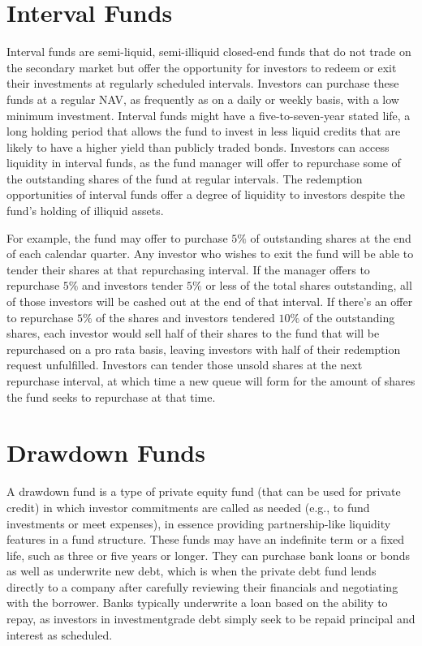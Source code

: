 \documentclass[11pt]{article}
\begin{document}
\section*{Interval Funds}
Interval funds are semi-liquid, semi-illiquid closed-end funds that do not trade on the secondary market but offer the opportunity for investors to redeem or exit their investments at regularly scheduled intervals. Investors can purchase these funds at a regular NAV, as frequently as on a daily or weekly basis, with a low minimum investment. Interval funds might have a five-to-seven-year stated life, a long holding period that allows the fund to invest in less liquid credits that are likely to have a higher yield than publicly traded bonds. Investors can access liquidity in interval funds, as the fund manager will offer to repurchase some of the outstanding shares of the fund at regular intervals. The redemption opportunities of interval funds offer a degree of liquidity to investors despite the fund's holding of illiquid assets.

For example, the fund may offer to purchase $5 \%$ of outstanding shares at the end of each calendar quarter. Any investor who wishes to exit the fund will be able to tender their shares at that repurchasing interval. If the manager offers to repurchase $5 \%$ and investors tender $5 \%$ or less of the total shares outstanding, all of those investors will be cashed out at the end of that interval. If there's an offer to repurchase $5 \%$ of the shares and investors tendered $10 \%$ of the outstanding shares, each investor would sell half of their shares to the fund that will be repurchased on a pro rata basis, leaving investors with half of their redemption request unfulfilled. Investors can tender those unsold shares at the next repurchase interval, at which time a new queue will form for the amount of shares the fund seeks to repurchase at that time.

\section*{Drawdown Funds}
A drawdown fund is a type of private equity fund (that can be used for private credit) in which investor commitments are called as needed (e.g., to fund investments or meet expenses), in essence providing partnership-like liquidity features in a fund structure. These funds may have an indefinite term or a fixed life, such as three or five years or longer. They can purchase bank loans or bonds as well as underwrite new debt, which is when the private debt fund lends directly to a company after carefully reviewing their financials and negotiating with the borrower. Banks typically underwrite a loan based on the ability to repay, as investors in investmentgrade debt simply seek to be repaid principal and interest as scheduled.
\end{document}
